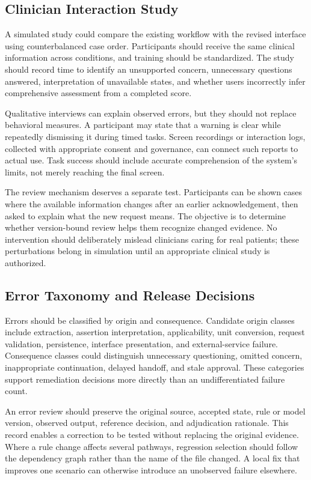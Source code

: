 \documentclass[conference]{IEEEtran}
\begin{document}
\subsection{Clinician Interaction Study}
A simulated study could compare the existing workflow with the revised interface using counterbalanced case order. Participants should receive the same clinical information across conditions, and training should be standardized. The study should record time to identify an unsupported concern, unnecessary questions answered, interpretation of unavailable states, and whether users incorrectly infer comprehensive assessment from a completed score.

Qualitative interviews can explain observed errors, but they should not replace behavioral measures. A participant may state that a warning is clear while repeatedly dismissing it during timed tasks. Screen recordings or interaction logs, collected with appropriate consent and governance, can connect such reports to actual use. Task success should include accurate comprehension of the system's limits, not merely reaching the final screen.

The review mechanism deserves a separate test. Participants can be shown cases where the available information changes after an earlier acknowledgement, then asked to explain what the new request means. The objective is to determine whether version-bound review helps them recognize changed evidence. No intervention should deliberately mislead clinicians caring for real patients; these perturbations belong in simulation until an appropriate clinical study is authorized.

\subsection{Error Taxonomy and Release Decisions}
Errors should be classified by origin and consequence. Candidate origin classes include extraction, assertion interpretation, applicability, unit conversion, request validation, persistence, interface presentation, and external-service failure. Consequence classes could distinguish unnecessary questioning, omitted concern, inappropriate continuation, delayed handoff, and stale approval. These categories support remediation decisions more directly than an undifferentiated failure count.

An error review should preserve the original source, accepted state, rule or model version, observed output, reference decision, and adjudication rationale. This record enables a correction to be tested without replacing the original evidence. Where a rule change affects several pathways, regression selection should follow the dependency graph rather than the name of the file changed. A local fix that improves one scenario can otherwise introduce an unobserved failure elsewhere.
\end{document}
